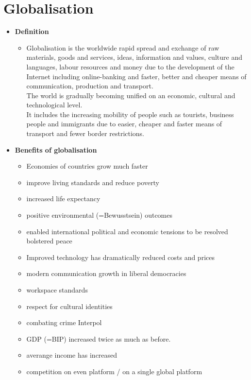 \documentclass[a5paper,12pt,twoside,titlepage]{scrartcl}
\begin{document}
\section{Globalisation}
\begin{itemize}
	\item\textbf{Definition}
	\begin{itemize}
		\item Globalisation is the worldwide rapid spread and exchange of raw materials, goods and services, ideas, information and values, culture and languages, labour resources and money due to the development of the Internet including online-banking and faster, better and cheaper means of communication, production and transport. \\
		The world is gradually becoming unified on an economic, cultural and technological level. \\
		It includes the increasing mobility of people such as tourists, business people and immigrants due to easier, cheaper and faster means of transport and fewer border restrictions.
	\end{itemize}

	\item \textbf{Benefits of globalisation}
	\begin{itemize}
		\item Economies of countries grow much faster
		\item improve living standards and reduce poverty
		\item increased life expectancy
		\item positive environmental (=Bewusstsein) outcomes
		\item enabled international political and economic tensions to be resolved bolstered peace
		\item Improved technology has dramatically reduced costs and prices
		\item modern communication growth in liberal democracies
		\item workspace standards
		\item respect for cultural identities
		\item combating crime \textrightarrow Interpol
		\item GDP (=BIP) increased twice as much as before. 
		\item averange income has increased
		\item competition on even platform / on a single global platform
	\end{itemize}


\end{itemize}
\end{document}
